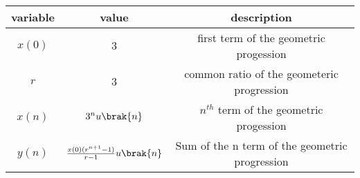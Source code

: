 \begin{tabular}{|c|c|c|}
   \hline
   variable&value&description  \\
   \hline
   $x(0)$ & $3$ & first term of the geometric progession\\
   \hline
   $r$ & $3$ & common ratio of the geometeric progression\\
   \hline
   $x(n)$ & $3^{n}u\brak{n}$& $n^{th}$ term of the geometric progession\\
   \hline
   $y(n)$ &$\frac{x(0)(r^{n+1}-1)}{r-1}u\brak{n}$ &Sum of the n term of the geometric progression\\
   \hline 
\end{tabular}

